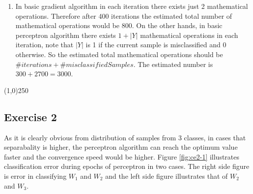 \documentclass[12pt]{article}
\begin{document}
\begin{enumerate}
\item In basic gradient algorithm in each iteration there exists just 2 mathematical operations. Therefore after 400 iterations the estimated total number of mathematical operations would be 800. On the other hands, in basic perceptron algorithm there exists $1 + |Y|$ mathematical operations in each iteration, note that $|Y|$ is 1 if the current sample is misclassified and 0 otherwise. So the estimated total mathematical operations should be $\#iterations + \#misclassifiedSamples$. The estimated number is $300 + 2700 = 3000$.
\end{enumerate}

\begin{center}
\line(1,0){250}
\end{center}

\subsection{Exercise 2}

As it is clearly obvious from distribution of samples from 3 classes, in cases that separabality is higher, the perceptron algorithm can reach the optimum value faster and the convergence speed would be higher. Figure \ref{fig:ce2-1} illustrates classification error during epochs of perceptron in two cases. The right side figure is error in classifying $W_1$ and $W_2$ and the left side figure illustrates that of $W_2$ and $W_3$.
\end{document}
